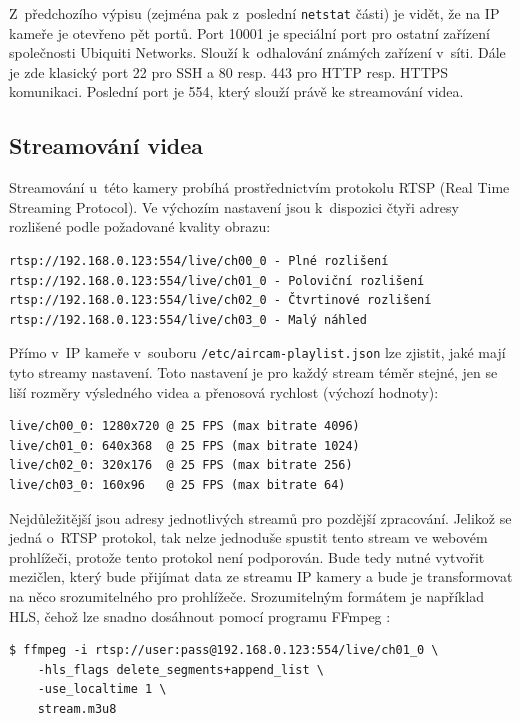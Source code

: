 Z~předchozího výpisu (zejména pak z~poslední \texttt{netstat} části) je vidět, že na IP kameře je otevřeno pět portů. Port 10001 je speciální port pro ostatní zařízení společnosti Ubiquiti Networks. Slouží k~odhalování známých zařízení v~síti. Dále je zde klasický port 22 pro SSH a 80 resp. 443 pro HTTP resp. HTTPS komunikaci. Poslední port je 554, který slouží právě ke streamování videa.

\subsection{Streamování videa}
Streamování u~této kamery probíhá prostřednictvím protokolu RTSP (Real Time Streaming Protocol). Ve výchozím nastavení jsou k~dispozici čtyři adresy rozlišené podle požadované kvality obrazu:

\begin{verbatim}
rtsp://192.168.0.123:554/live/ch00_0 - Plné rozlišení
rtsp://192.168.0.123:554/live/ch01_0 - Poloviční rozlišení
rtsp://192.168.0.123:554/live/ch02_0 - Čtvrtinové rozlišení
rtsp://192.168.0.123:554/live/ch03_0 - Malý náhled
\end{verbatim}

Přímo v~IP kameře v~souboru \texttt{/etc/aircam-playlist.json} lze zjistit, jaké mají tyto streamy nastavení. Toto nastavení je pro každý stream téměr stejné, jen se liší rozměry výsledného videa a přenosová rychlost (výchozí hodnoty):

\begin{verbatim}
live/ch00_0: 1280x720 @ 25 FPS (max bitrate 4096)
live/ch01_0: 640x368  @ 25 FPS (max bitrate 1024)
live/ch02_0: 320x176  @ 25 FPS (max bitrate 256)
live/ch03_0: 160x96   @ 25 FPS (max bitrate 64)
\end{verbatim}

Nejdůležitější jsou adresy jednotlivých streamů pro pozdější zpracování. Jelikož se jedná o~RTSP protokol, tak nelze jednoduše spustit tento stream ve webovém prohlížeči, protože tento protokol není podporován. Bude tedy nutné vytvořit mezičlen, který bude přijímat data ze streamu IP kamery a bude je transformovat na něco srozumitelného pro prohlížeče. Srozumitelným formátem je například HLS, čehož lze snadno dosáhnout pomocí programu FFmpeg \cite{ffmpeg}:

\begin{verbatim}
$ ffmpeg -i rtsp://user:pass@192.168.0.123:554/live/ch01_0 \
    -hls_flags delete_segments+append_list \
    -use_localtime 1 \
    stream.m3u8
\end{verbatim}

